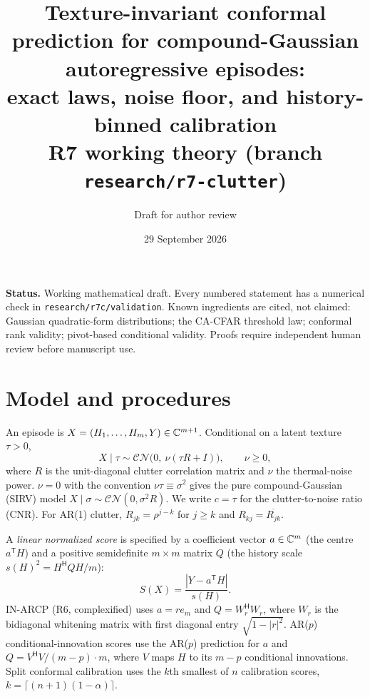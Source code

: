 \documentclass[11pt]{article}
\title{Texture-invariant conformal prediction for compound-Gaussian autoregressive episodes:\\ exact laws, noise floor, and history-binned calibration\\\large R7 working theory (branch \texttt{research/r7-clutter})}
\author{Draft for author review}
\date{29 September 2026}
\theoremstyle{remark}\newtheorem{remark}{Remark}
\begin{document}
\maketitle
\noindent\textbf{Status.} Working mathematical draft. Every numbered statement has a numerical check in \texttt{research/r7c/validation}. Known ingredients are cited, not claimed: Gaussian quadratic-form distributions; the CA-CFAR threshold law; conformal rank validity; pivot-based conditional validity. Proofs require independent human review before manuscript use.

\section{Model and procedures}
An episode is $X=(H_1,\dots,H_m,Y)\in\mathbb C^{m+1}$. Conditional on a latent texture $\tau>0$,
\begin{equation}
X\mid\tau\sim\mathcal{CN}\big(0,\ \nu(\tau R+I)\big),\qquad \nu\ge0,\label{eq:model}
\end{equation}
where $R$ is the unit-diagonal clutter correlation matrix and $\nu$ the thermal-noise power. $\nu=0$ with the convention $\nu\tau\equiv\sigma^2$ gives the pure compound-Gaussian (SIRV) model $X\mid\sigma\sim\mathcal{CN}(0,\sigma^2R)$. We write $c=\tau$ for the clutter-to-noise ratio (CNR). For AR(1) clutter, $R_{jk}=\rho^{j-k}$ for $j\ge k$ and $R_{kj}=\overline{R_{jk}}$.

A \emph{linear normalized score} is specified by a coefficient vector $a\in\mathbb C^m$ (the centre $a^{\mathsf T}H$) and a positive semidefinite $m\times m$ matrix $Q$ (the history scale $s(H)^2=H^{\mathsf H}QH/m$):
\begin{equation}
S(X)=\frac{|Y-a^{\mathsf T}H|}{s(H)}.\label{eq:score}
\end{equation}
IN-ARCP (R6, complexified) uses $a=r e_m$ and $Q=W_r^{\mathsf H}W_r$, where $W_r$ is the bidiagonal whitening matrix with first diagonal entry $\sqrt{1-|r|^2}$. AR($p$) conditional-innovation scores use the AR($p$) prediction for $a$ and $Q=V^{\mathsf H}V/ (m-p)\cdot m$, where $V$ maps $H$ to its $m-p$ conditional innovations. Split conformal calibration uses the $k$th smallest of $n$ calibration scores, $k=\lceil(n+1)(1-\alpha)\rceil$.
\end{document}
